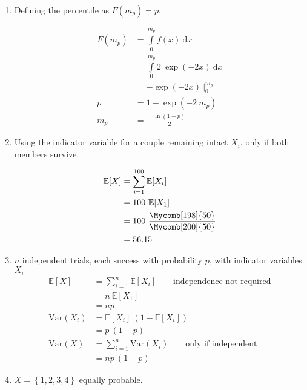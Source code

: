 \begin{enumerate}
	
	\item Defining the percentile as $ F(m_p) = p $.
	
		\begin{align}
			F(m_p) &= \int\limits_{0}^{m_p} f(x)\ \mathrm{d}x \nonumber \\
			&= \int\limits_{0}^{m_p} 2\ \exp(-2x)\ \mathrm{d}x \nonumber \\
			&= -\exp(-2x)\ \Big|_{0}^{m_p} \\
			p &= 1 - \exp(-2\ m_p) \nonumber \\
			m_p &= - \frac{\ln(1 - p)}{2}
		\end{align}
	
	
	\item Using the indicator variable for a couple remaining intact $ X_i $, only if both members survive,
	
		\begin{align}
			\mathbb{E}[X] &= \sum\limits_{i = 1}^{100} \mathbb{E}[X_i] \nonumber \\
			&= 100\ \mathbb{E}[X_1] \nonumber \\
			&= 100\ \frac{\Mycomb[198]{50}}{\Mycomb[200]{50}} \nonumber \\
			&= 56.15
		\end{align}
	
	
	\item $ n $ independent trials, each success with probability $ p $, with indicator variables $ X_i $ \\
	
		\begin{align}
			\mathbb{E}[X] &= \sum\limits_{i = 1}^{n} \mathbb{E}[X_i] \qquad \text{independence not required} \nonumber \\
			&= n\ \mathbb{E}[X_1] \nonumber \\
			&= np   \\
			\mathrm{Var}(X_i) &= \mathbb{E}[X_i]\ (1 - \mathbb{E}[X_i]) \nonumber \\
			&= p\ (1 - p) \nonumber \\
			\mathrm{Var}(X) &= \sum\limits_{i = 1}^{n} \mathrm{Var}(X_i) \qquad \text{only if independent} \nonumber \\
			&= np\ (1-p)
		\end{align}
	
	
	\item $X = \left\{1, 2, 3, 4\right\} $ equally probable.
	
		\begin{enumerate}
			

\end{enumerate}
\end{enumerate}
